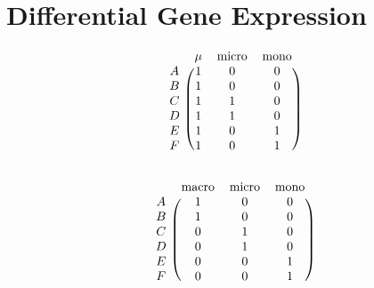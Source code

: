 \section{Differential Gene Expression}

\begin{multicols}{2}

\[
	\begin{blockarray}{cccc}
		& \mu & \text{micro} & \text{mono} &  \\
		\begin{block}{c(ccc)}
			A & 1 & 0 & 0  \\
			B & 1 & 0 & 0  \\
			C & 1 & 1 & 0  \\
			D & 1 & 1 & 0  \\
			E & 1 & 0 & 1  \\
		    F & 1 & 0 & 1  \\
		\end{block}
	\end{blockarray}
\]

\[
	\begin{blockarray}{cccc}
		& \text{macro} & \text{micro} & \text{mono} &  \\
		\begin{block}{c(ccc)}
			A & 1 & 0 & 0  \\
			B & 1 & 0 & 0  \\
			C & 0 & 1 & 0  \\
			D & 0 & 1 & 0  \\
			E & 0 & 0 & 1  \\
			F & 0 & 0 & 1  \\
		\end{block}
	\end{blockarray}
\]

\end{multicols}